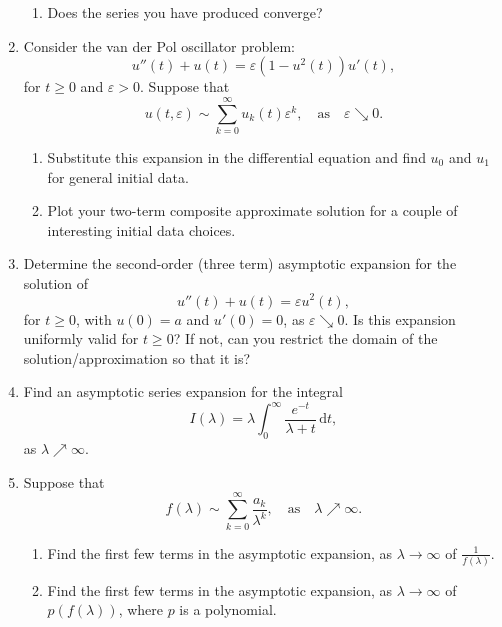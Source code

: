 \documentclass[12pt]{letter}
\begin{document}
\begin{enumerate}
\begin{enumerate}
	\item
Does the series you have produced converge? 
	\end{enumerate}
	
	\item
Consider the van der Pol oscillator problem:
	\[
u''(t) +u(t) = \varepsilon(1-u^2(t)) u'(t),	
	\]
for $t\ge 0$ and $\varepsilon >0$. Suppose that
	\[
u(t,\varepsilon) \sim \sum_{k=0}^\infty u_k(t)\varepsilon^k , \quad \mbox{as} \quad \varepsilon\searrow 0.	
	\]
	\begin{enumerate}
	\item
Substitute this expansion in the differential equation and find $u_0$ and $u_1$ for general initial data.

	\item
Plot your two-term composite approximate solution for a couple of interesting initial data choices.
	\end{enumerate}
	
	\item
Determine the second-order (three term) asymptotic expansion for the solution of 
	\[
u''(t) + u(t) = \varepsilon u^2(t),
	\]
for $t\ge 0$, with $u(0) = a$ and $u'(0) = 0$, as $\varepsilon \searrow 0$. Is this expansion uniformly valid for $t\ge 0$? If not, can you restrict the domain of the solution/approximation so that it is? 
	
	
	\item
Find an asymptotic series expansion for the integral
	\[
I(\lambda) = \lambda\int_0^\infty \frac{e^{-t}}{\lambda + t} \, \mathrm{d} t,	
	\]
as $\lambda\nearrow \infty$.

	\item
Suppose that 
	\[
f(\lambda) \sim \sum_{k =0}^\infty \frac{a_k}{\lambda^k}, \quad \mbox{as} \quad \lambda \nearrow \infty.	
	\]
	\begin{enumerate}
	\item
Find the first few terms in the asymptotic expansion, as $\lambda\to\infty$ of $\frac{1}{f(\lambda)}$.
	\item
Find the first few terms in the asymptotic expansion, as $\lambda\to\infty$ of $p(f(\lambda))$, where $p$ is a polynomial.
	\end{enumerate}
	
	\end{enumerate}
	
    
\end{document}
